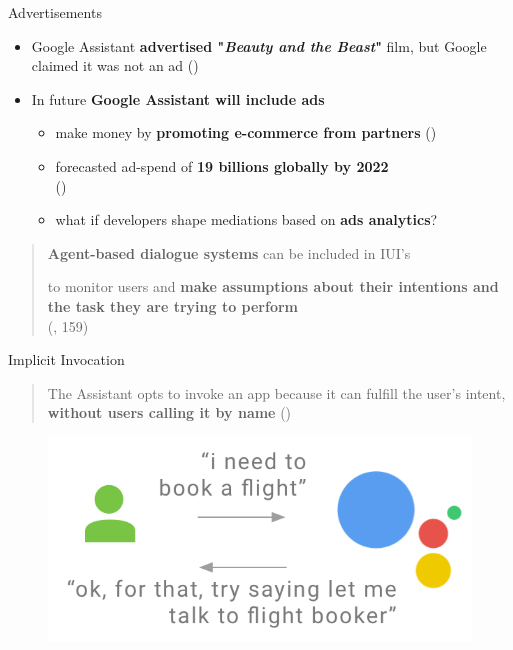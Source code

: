 \documentclass{beamer}
\begin{document}
\begin{frame}[allowframebreaks]
\begin{block}{Advertisements}
	\begin{itemize}
		\item Google Assistant \textbf{advertised "\emph{Beauty and the Beast}"} film, but Google claimed it was not an ad (\cite{androidPolice})
		\medskip
		\item In future \textbf{Google Assistant will include ads}
			\begin{itemize}
				\item make money by \textbf{promoting e-commerce from partners} (\cite{recode})
				\smallskip
				\item forecasted ad-spend of \textbf{19 billions globally by 2022}
				\\(\cite{juniper})
				\smallskip
				\item what if developers shape mediations based on \textbf{ads analytics}?
			\end{itemize}
	\end{itemize}
\end{block}

\framebreak
\begin{quote}
	\textbf{Agent-based dialogue systems} can be included in IUI’s

	to monitor users and \textbf{make assumptions about their intentions and the task they are trying to perform} \\(\cite{brey2005freedom}, 159)
\end{quote}

\begin{block}{Implicit Invocation}
\begin{quote}
The Assistant opts to invoke an app because it can fulfill the user's intent, \textbf{without users calling it by name} (\cite{googleactions})
\end{quote}
\vspace{-0.5cm}
\begin{figure}
	\centering
	\includegraphics[width=0.55\linewidth]{images/implicit-invocation}
\end{figure}


\end{block}
\end{frame}
\end{document}
